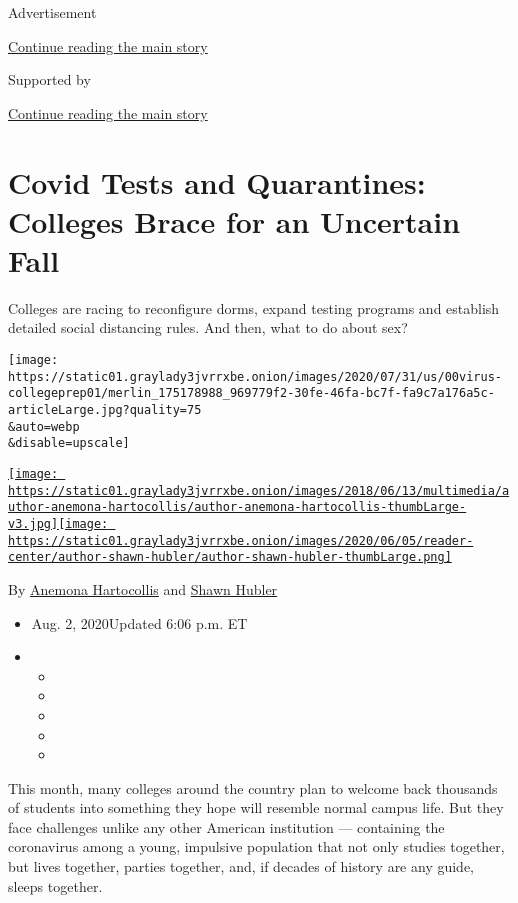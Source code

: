 Advertisement

\protect\hyperlink{after-top}{Continue reading the main story}

Supported by

\protect\hyperlink{after-sponsor}{Continue reading the main story}

\hypertarget{covid-tests-and-quarantines-colleges-brace-for-an-uncertain-fall}{%
\section{Covid Tests and Quarantines: Colleges Brace for an Uncertain
Fall}\label{covid-tests-and-quarantines-colleges-brace-for-an-uncertain-fall}}

Colleges are racing to reconfigure dorms, expand testing programs and
establish detailed social distancing rules. And then, what to do about
sex?

\texttt{[image: https://static01.graylady3jvrrxbe.onion/images/2020/07/31/us/00virus-collegeprep01/merlin\_175178988\_969779f2-30fe-46fa-bc7f-fa9c7a176a5c-articleLarge.jpg?quality=75\\\&auto=webp\\\&disable=upscale]}

\href{https://www.nytimes3xbfgragh.onion/by/anemona-hartocollis}{\texttt{[image: https://static01.graylady3jvrrxbe.onion/images/2018/06/13/multimedia/author-anemona-hartocollis/author-anemona-hartocollis-thumbLarge-v3.jpg]}}\href{https://www.nytimes3xbfgragh.onion/by/shawn-hubler}{\texttt{[image: https://static01.graylady3jvrrxbe.onion/images/2020/06/05/reader-center/author-shawn-hubler/author-shawn-hubler-thumbLarge.png]}}

By
\href{https://www.nytimes3xbfgragh.onion/by/anemona-hartocollis}{Anemona
Hartocollis} and
\href{https://www.nytimes3xbfgragh.onion/by/shawn-hubler}{Shawn Hubler}

\begin{itemize}
\item
  Aug. 2, 2020Updated 6:06 p.m. ET
\item
  \begin{itemize}
  \item
  \item
  \item
  \item
  \item
  \end{itemize}
\end{itemize}

This month, many colleges around the country plan to welcome back
thousands of students into something they hope will resemble normal
campus life. But they face challenges unlike any other American
institution --- containing the coronavirus among a young, impulsive
population that not only studies together, but lives together, parties
together, and, if decades of history are any guide, sleeps together.

